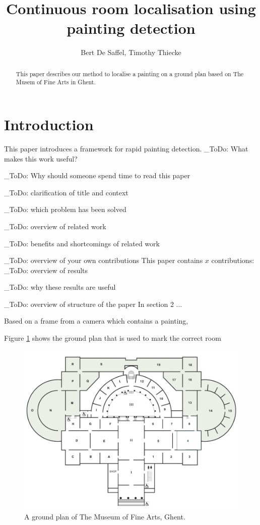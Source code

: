\documentclass[10pt,final,journal]{IEEEtran}
\title{Continuous room localisation using painting detection}
\author{Bert De Saffel, Timothy Thiecke}
\newcommand{\todo}[1]{\color{red}\_ToDo: #1 \color{black}}
\begin{document}
	\maketitle
	\begin{abstract}
		
		This paper describes our method to localise a painting on a ground plan based on The Musem of Fine Arts in Ghent. 
	\end{abstract}


	\section{Introduction}
	This paper introduces a framework for rapid painting detection.
	\todo{What makes this work useful?}
	
	\todo{Why should someone spend time to read this paper}
	
	\todo{clarification of title and context}
	
	\todo{which problem has been solved}
	
	\todo{overview of related work}
	
	\todo{benefits and shortcomings of related work}
	
	\todo{overview of your own contributions}
	This paper contains $x$ contributions:
	\todo{overview of results}
	
	\todo{why these results are useful}
	
	\todo{overview of structure of the paper}
	In section 2 ...

	
	Based on a frame from a camera which contains a painting, 
	
	Figure \ref{fig:groundplan_msk} shows the ground plan that is used to mark the correct room
	
	\begin{figure}
		\includegraphics[width=\linewidth]{groundplan_msk}
		\caption{A ground plan of The Museum of Fine Arts, Ghent. }
		\label{fig:groundplan_msk}
	\end{figure}
\end{document}
